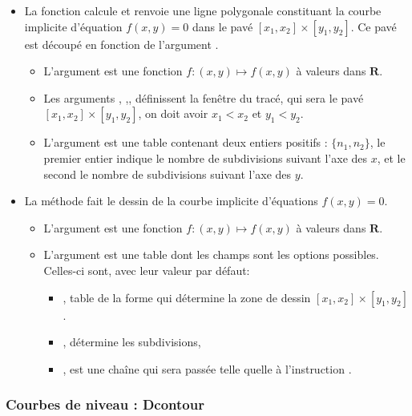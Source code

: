 \begin{itemize}
\item La fonction  calcule et renvoie une ligne polygonale constituant la courbe implicite d'équation $f(x,y)=0$ dans le pavé $[x_1,x_2]\times[y_1,y_2]$. Ce pavé est découpé en fonction de l'argument .

      \begin{itemize}
      \item L'argument  est une fonction \(f\colon (x,y) \mapsto f(x,y)\) à valeurs dans \(\mathbf R\).
      \item Les arguments ,  ,,  définissent la fenêtre du tracé, qui sera le pavé $[x_1,x_2]\times[y_1,y_2]$, on doit avoir \(x_1<x_2\) et \(y_1<y_2\).
      \item L'argument  est une table contenant deux entiers positifs : $\{n_1,n_2\}$, le premier entier indique le nombre de subdivisions suivant l'axe des $x$, et le second le nombre de subdivisions suivant l'axe des $y$.
      \end{itemize}
  
\item La méthode  fait le dessin de la courbe implicite d'équations $f(x,y)=0$.
      \begin{itemize}
      \item L'argument  est une fonction \(f\colon (x,y) \mapsto f(x,y)\) à valeurs dans \(\mathbf R\).
      \item L'argument  est une table dont les champs sont les options possibles. Celles-ci sont, avec leur valeur par défaut:

            \begin{itemize}
                \item {}, table de la forme  qui détermine la zone de dessin $[x_1,x_2]\times[y_1,y_2]$.
                \item {}, détermine les subdivisions,
                \item {}, est une chaîne qui sera passée telle quelle à l'instruction \drawcmd.
            \end{itemize}
      \end{itemize}
\end{itemize}

\subsubsection{Courbes de niveau : Dcontour}

